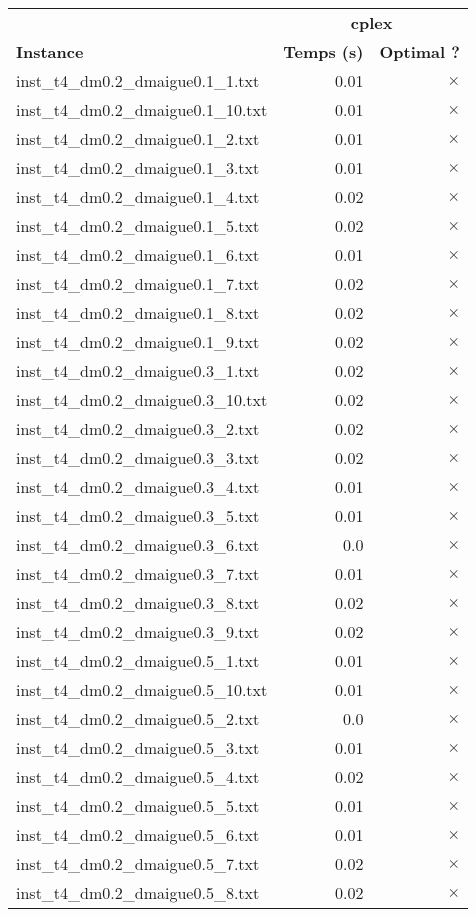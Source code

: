 \documentclass{article}
\begin{document}
\begin{center}
\renewcommand{\arraystretch}{1.4} 
 \begin{tabular}{lrr}
	\hline
 & \multicolumn{2}{c}{\textbf{cplex}}\\
\textbf{Instance}  & \textbf{Temps (s)} & \textbf{Optimal ?} \\\hline

inst\_t4\_dm0.2\_dmaigue0.1\_1.txt & 0.01 & 
$\times$
\\
inst\_t4\_dm0.2\_dmaigue0.1\_10.txt & 0.01 & 
$\times$
\\
inst\_t4\_dm0.2\_dmaigue0.1\_2.txt & 0.01 & 
$\times$
\\
inst\_t4\_dm0.2\_dmaigue0.1\_3.txt & 0.01 & 
$\times$
\\
inst\_t4\_dm0.2\_dmaigue0.1\_4.txt & 0.02 & 
$\times$
\\
inst\_t4\_dm0.2\_dmaigue0.1\_5.txt & 0.02 & 
$\times$
\\
inst\_t4\_dm0.2\_dmaigue0.1\_6.txt & 0.01 & 
$\times$
\\
inst\_t4\_dm0.2\_dmaigue0.1\_7.txt & 0.02 & 
$\times$
\\
inst\_t4\_dm0.2\_dmaigue0.1\_8.txt & 0.02 & 
$\times$
\\
inst\_t4\_dm0.2\_dmaigue0.1\_9.txt & 0.02 & 
$\times$
\\
inst\_t4\_dm0.2\_dmaigue0.3\_1.txt & 0.02 & 
$\times$
\\
inst\_t4\_dm0.2\_dmaigue0.3\_10.txt & 0.02 & 
$\times$
\\
inst\_t4\_dm0.2\_dmaigue0.3\_2.txt & 0.02 & 
$\times$
\\
inst\_t4\_dm0.2\_dmaigue0.3\_3.txt & 0.02 & 
$\times$
\\
inst\_t4\_dm0.2\_dmaigue0.3\_4.txt & 0.01 & 
$\times$
\\
inst\_t4\_dm0.2\_dmaigue0.3\_5.txt & 0.01 & 
$\times$
\\
inst\_t4\_dm0.2\_dmaigue0.3\_6.txt & 0.0 & 
$\times$
\\
inst\_t4\_dm0.2\_dmaigue0.3\_7.txt & 0.01 & 
$\times$
\\
inst\_t4\_dm0.2\_dmaigue0.3\_8.txt & 0.02 & 
$\times$
\\
inst\_t4\_dm0.2\_dmaigue0.3\_9.txt & 0.02 & 
$\times$
\\
inst\_t4\_dm0.2\_dmaigue0.5\_1.txt & 0.01 & 
$\times$
\\
inst\_t4\_dm0.2\_dmaigue0.5\_10.txt & 0.01 & 
$\times$
\\
inst\_t4\_dm0.2\_dmaigue0.5\_2.txt & 0.0 & 
$\times$
\\
inst\_t4\_dm0.2\_dmaigue0.5\_3.txt & 0.01 & 
$\times$
\\
inst\_t4\_dm0.2\_dmaigue0.5\_4.txt & 0.02 & 
$\times$
\\
inst\_t4\_dm0.2\_dmaigue0.5\_5.txt & 0.01 & 
$\times$
\\
inst\_t4\_dm0.2\_dmaigue0.5\_6.txt & 0.01 & 
$\times$
\\
inst\_t4\_dm0.2\_dmaigue0.5\_7.txt & 0.02 & 
$\times$
\\
inst\_t4\_dm0.2\_dmaigue0.5\_8.txt & 0.02 & 
$\times$
\\
\hline\end{tabular}
\end{center}
\end{document}
